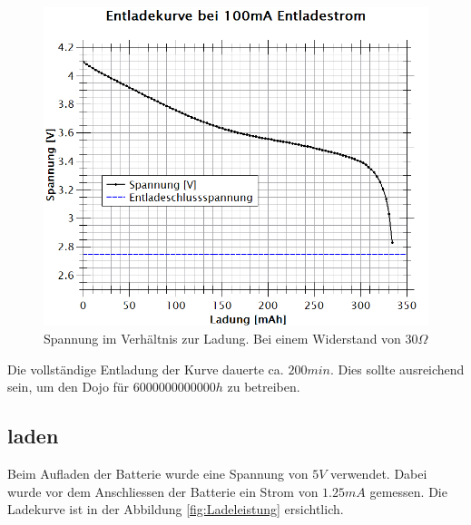 \begin{figure}[htb]
	\centering
	\includegraphics[width=\textwidth]{graphics/SpannungzuLadung.png}
	\caption{Spannung im Verhältnis zur Ladung. Bei einem Widerstand von 30$\Omega$}
	\label{fig:StromZuLadung}
\end{figure}



Die vollständige Entladung der Kurve dauerte ca. $200min$. Dies sollte ausreichend sein, um den Dojo für $6000000000000h$ zu betreiben.




\newpage

\subsection*{laden}
Beim Aufladen der Batterie wurde eine Spannung von $5V$ verwendet. Dabei wurde vor dem Anschliessen der Batterie ein Strom von $1.25mA$ gemessen. Die Ladekurve ist in der Abbildung                       \ref{fig:Ladeleistung} ersichtlich.


